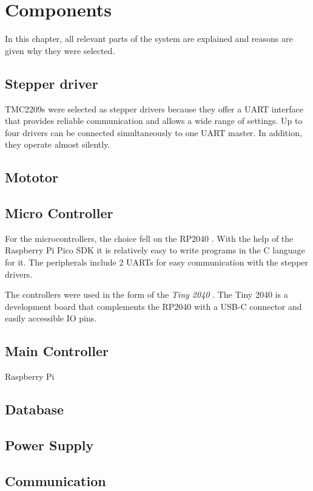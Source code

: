 \chapter{Components}

In this chapter, all relevant parts of the system are explained and reasons are given why they were selected.

\section{Stepper driver}

TMC2209s were selected as stepper drivers because they offer a UART interface that provides reliable communication and allows a wide range of settings. 
Up to four drivers can be connected simultaneously to one UART master. In addition, they operate almost silently. \cite{tmc2209} 

\section{Mototor}



\section{Micro Controller}

For the microcontrollers, the choice fell on the RP2040 \cite{rp2040}. With the help of the Raspberry Pi Pico SDK \cite{sdk} it is relatively easy to write programs in the C language for it. The peripherals include 2 UARTs for easy communication with the stepper drivers. 

The controllers were used in the form of the \textit{Tiny 2040} \cite{tiny2040}. The Tiny 2040 is a development board that complements the RP2040 with a USB-C connector and easily accessible IO pins.

\section{Main Controller}

Raspberry Pi

\section{Database}



\section{Power Supply}



\section{Communication}



